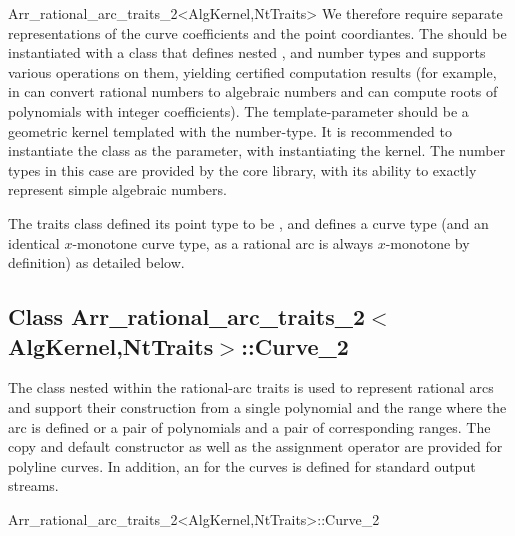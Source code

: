 \begin{ccRefClass}{Arr_rational_arc_traits_2<AlgKernel,NtTraits>}
We therefore require separate representations of the curve coefficients and
the point coordiantes. The  should be instantiated with a class
that defines nested ,  and  number
types and supports various operations on them, yielding certified computation
results (for example, in can convert rational numbers to algebraic numbers
and can compute roots of polynomials with integer coefficients).
The  template-parameter should be a geometric kernel templated
with the  number-type. It is recommended to
instantiate the  class as the 
parameter, with  instantiating the kernel.
The number types in this case are provided by the {\sc core} library, with its
ability to exactly represent simple algebraic numbers.

The traits class defined its point type to be ,
and defines a curve type (and an identical $x$-monotone curve type, as 
a rational arc is always $x$-monotone by definition) as detailed below.


\ccIsModel

\subsection*{Class
         Arr\_rational\_arc\_traits\_2$<$AlgKernel,NtTraits$>$::Curve\_2}

The  class nested within the rational-arc traits is used
to represent rational arcs and support their construction from a
single polynomial and the range where the arc is defined or a pair of
polynomials and a pair of corresponding ranges. The copy and default
constructor as well as the assignment operator are provided for
polyline curves. In addition, an  for the curves is
defined for standard output streams.

\begin{ccClass}{Arr_rational_arc_traits_2<AlgKernel,NtTraits>::Curve_2}

\ccTypes



\end{ccClass}
\end{ccRefClass}
